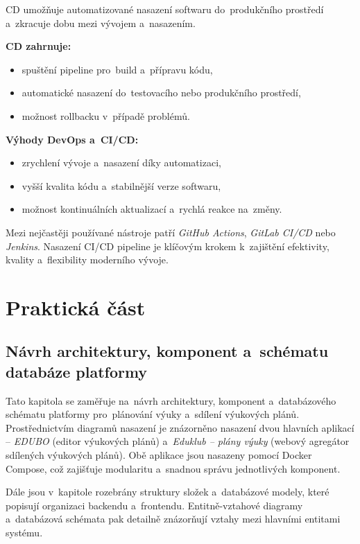 \documentclass[male,czech,api_bc]{kitheses}
\begin{document}
CD umožňuje automatizované nasazení softwaru do~produkčního prostředí a~zkracuje dobu mezi vývojem a~nasazením.

\textbf{CD zahrnuje:}
\begin{itemize}
	\item spuštění pipeline pro~build a~přípravu kódu,
	\item automatické nasazení do~testovacího nebo produkčního prostředí,
	\item možnost rollbacku v~případě problémů.
\end{itemize}

\textbf{Výhody DevOps a~CI/CD:}
\begin{itemize}
	\item zrychlení vývoje a~nasazení díky automatizaci,
	\item vyšší kvalita kódu a~stabilnější verze softwaru,
	\item možnost kontinuálních aktualizací a~rychlá reakce na~změny.
\end{itemize}

Mezi nejčastěji používané nástroje patří \textit{GitHub Actions}, \textit{GitLab CI/CD} nebo \textit{Jenkins}. Nasazení CI/CD pipeline je klíčovým krokem k~zajištění efektivity, kvality a~flexibility moderního vývoje.

\chapter{Praktická část}

\section{Návrh architektury, komponent a~schématu databáze platformy}

Tato kapitola se zaměřuje na~návrh architektury, komponent a~databázového schématu platformy pro~plánování výuky a~sdílení výukových plánů. Prostřednictvím diagramů nasazení je znázorněno nasazení dvou hlavních aplikací – \textit{EDUBO} (editor výukových plánů) a~\textit{Eduklub – plány výuky} (webový agregátor sdílených výukových plánů). Obě aplikace jsou nasazeny pomocí Docker Compose, což zajišťuje modularitu a~snadnou správu jednotlivých komponent.

Dále jsou v~kapitole rozebrány struktury složek a~databázové modely, které popisují organizaci backendu a~frontendu. Entitně-vztahové diagramy a~databázová schémata pak detailně znázorňují vztahy mezi hlavními entitami systému.
\end{document}

